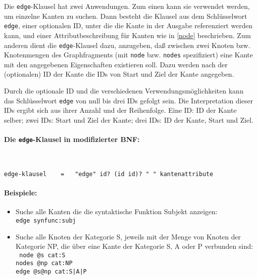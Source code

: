 \documentclass[12pt]{scrartcl}
\begin{document}
Die \texttt{edge}-Klausel hat zwei Anwendungen. Zum einen kann sie verwendet werden, um einzelne Kanten zu suchen. Dann besteht die Klausel aus dem Schlüsselwort \texttt{edge}, einer optionalen ID, unter die die Kante in der Ausgabe referenziert werden kann, und einer Attributbeschreibung für Kanten wie in \ref{node} beschrieben. Zum anderen dient die \texttt{edge}-Klausel dazu, anzugeben, daß zwischen zwei Knoten bzw. Knotenmengen des Graphfragments (mit \texttt{node} bzw. \texttt{nodes} spezifiziert) eine Kante mit den angegebenen Eigenschaften existieren soll. Dazu werden nach der (optionalen) ID der Kante die IDs von Start und Ziel der Kante angegeben.

Durch die optionale ID und die verschiedenen Verwendungsmöglichkeiten kann das Schlüsselwort \texttt{edge} von null bis drei IDs gefolgt sein. Die Interpretation dieser IDs ergibt sich aus ihrer Anzahl und der Reihenfolge. Eine ID: ID der Kante selber; zwei IDs: Start und Ziel der Kante; drei IDs: ID der Kante, Start und Ziel.


\paragraph*{Die \texttt{edge}-Klausel in modifizierter BNF:}
~
\begin{framed}
\begin{lstlisting}
edge-klausel    =   "edge" id? (id id)? " " kantenattribute
\end{lstlisting}
\end{framed}


\paragraph*{Beispiele:}
\begin{itemize}
	\item Suche alle Kanten die die syntaktische Funktion Subjekt anzeigen:\\
	{\tt edge synfunc:subj}
	\item Suche alle Knoten der Kategorie S, jeweils mit der Menge von Knoten der Kategorie NP, die über eine Kante der Kategorie S, A oder P verbunden sind:\\
	{\tt
	node @s  cat:S\\[-.4ex]
	nodes @np cat:NP\\[-.4ex]
	edge @s@np cat:S|A|P
	}
\end{itemize}
\end{document}
